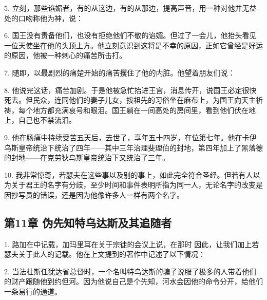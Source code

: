 5. 立刻，那些谄媚者，有的从这边，有的从那边，提高声音，用一种对他并无益处的口吻称他为神，说：\par

6. 国王没有责备他们，也没有拒绝他们不敬的谄媚。但过了一会儿，他抬头看见一位天使坐在他的头顶上方。他立刻意识到这将是不幸的原因，正如它曾经是好运的原因，他被一种刺心的痛苦所击打。\par

7. 随即，以最剧烈的痛楚开始的痛苦攫住了他的内脏。他望着朋友们说：\par

8. 他说完这话，痛苦加剧。于是他被急忙抬进王宫，消息传开，说国王必定很快死去。但民众，连同他们的妻子儿女，按祖先的习俗坐在麻布上，为国王向天主祈祷，每个地方都充满哀号和眼泪。国王躺在一间高处的房间里，看到他们伏在地上，自己也不禁流泪。\par

9. 他在肠痛中持续受苦五天后，去世了，享年五十四岁，在位第七年。他在卡伊乌斯皇帝统治下统治了四年——其中三年治理斐理伯的封地，第四年加上了黑落德的封地——在克劳狄乌斯皇帝统治下又统治了三年。\par

10. 我非常惊奇，若瑟夫在这些事以及别的事上，如此完全符合圣经。但若有人以为关于君王的名字有分歧，至少时间和事件表明所指为同一人，无论名字的改变是因抄写员的错误，还是因为他像许多人一样有两个名字。\par


\subsection{第11章 伪先知特乌达斯及其追随者}

1. 路加在中记载，加玛里耳在关于宗徒的会议上说，在那时  因此，让我们加上若瑟夫关于此人的记载。他在上文提到的著作中记述了以下情况：\par

2. 当法杜斯任犹达省总督时，一个名叫特乌达斯的骗子说服了极多的人带着他们的财产跟随他到约但河。因为他说自己是个先知，河水会因他的命令分开，给他们一条易行的通道。\par

